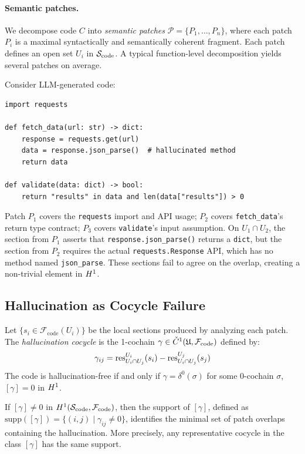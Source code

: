 \documentclass[11pt]{article}
\newcommand{\CodeSheaf}{\mathcal{F}_{\mathrm{code}}}
\newcommand{\CodeSite}{\Site_{\mathrm{code}}}
\newcommand{\SemPatch}{\mathcal{P}}
\begin{document}
\paragraph{Semantic patches.}
We decompose code $C$ into \emph{semantic patches}
$\SemPatch = \{P_1, \ldots, P_n\}$, where each patch $P_i$ is a
maximal syntactically and semantically coherent fragment.  Each
patch defines an open set $U_i$ in $\CodeSite$.  A typical
function-level decomposition yields several patches
on average.

\begin{example}\label{ex:api-misuse}
Consider LLM-generated code:
\begin{lstlisting}
import requests

def fetch_data(url: str) -> dict:
    response = requests.get(url)
    data = response.json_parse()  # hallucinated method
    return data

def validate(data: dict) -> bool:
    return "results" in data and len(data["results"]) > 0
\end{lstlisting}
Patch $P_1$ covers the \texttt{requests} import and API usage;
$P_2$ covers \texttt{fetch\_data}'s return type contract;
$P_3$ covers \texttt{validate}'s input assumption.
On $U_1 \cap U_2$, the section from $P_1$ asserts that
\texttt{response.json\_parse()} returns a \texttt{dict}, but the
section from $P_2$ requires the actual \texttt{requests.Response}
API, which has no method named \texttt{json\_parse}.  These sections
fail to agree on the overlap, creating a non-trivial element in $H^{1}$.
\end{example}


\subsection{Hallucination as Cocycle Failure}

\begin{definition}\label{def:hallu-cocycle}
Let $\{s_i \in \CodeSheaf(U_i)\}$ be the local sections produced
by analyzing each patch.  The \emph{hallucination cocycle} is the
1-cochain $\gamma \in \Cech^1(\mathfrak{U}, \CodeSheaf)$ defined by:
\[
  \gamma_{ij} = \mathrm{res}^{U_i}_{U_i \cap U_j}(s_i)
              - \mathrm{res}^{U_j}_{U_i \cap U_j}(s_j)
\]
The code is hallucination-free if and only if $\gamma = \delta^0(\sigma)$
for some 0-cochain $\sigma$, \ie $[\gamma] = 0$ in $H^{1}$.
\end{definition}

\begin{theorem}\label{thm:localization}
If $[\gamma] \neq 0$ in $\Hcoh{1}(\CodeSite, \CodeSheaf)$, then
the support of $[\gamma]$, defined as
$\mathrm{supp}([\gamma]) = \{(i,j) \mid \gamma_{ij} \neq 0\}$,
identifies the minimal set of patch overlaps containing the
hallucination.  More precisely, any representative cocycle in the
class $[\gamma]$ has the same support.
\end{theorem}
\end{document}
